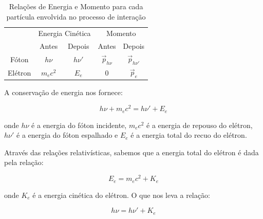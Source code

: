 \documentclass[11pt,a4paper]{article}
\begin{document}
            \begin{table}[h]
                \centering
                \caption{Relações de Energia e Momento para cada partícula envolvida no processo de interação}
                \label{tb:conservacaoEnergiaMomentoCompton}
                \begin{tabular}{c c c c c}
                    \hline
                    \addlinespace[5pt]
                    & \multicolumn{2}{c}{Energia Cinética} & \multicolumn{2}{c}{Momento} \\
                    \cline{2-5}
                    \addlinespace[5pt]
                    \multirow[c]{-2}{*}{Partícula} & Antes & Depois & Antes & Depois \\
                    \hline
                    \addlinespace[5pt]
                    Fóton & $h\nu$ & $h \nu'$ & $\vec{p}_{h\nu}$  & $\vec{p}_{h\nu'}$ \\
                    \addlinespace[5pt]
                    Elétron & $m_e c^2$ & $E_e$ & $0$ & $\vec{p}_e$ \\
                    \hline
                    \hline
                \end{tabular}
            \end{table}


    \noindent A conservação de energia nos fornece: 

            \begin{equation}
                h\nu + m_ec^2 = h \nu' + E_e
                \label{eq:conservacaoDeEnergiaCompton}
            \end{equation}

    \noindent onde $h\nu$ é a energia do fóton incidente, $m_ec^2$ é a energia de repouso do elétron, $h \nu'$ é a energia do fóton espalhado e $E_e$ é a energia total do recuo do elétron.

    \noindent Através das relações relativísticas, sabemos que a energia total do elétron é dada pela relação:

                \begin{equation}
                    E_e = m_e c^2 + K_e
                \end{equation}

    \noindent onde $K_e$ é a energia cinética do elétron. O que nos leva a relação:

                \begin{equation}
                    h \nu = h\nu' + K_e
                \end{equation}
\end{document}
